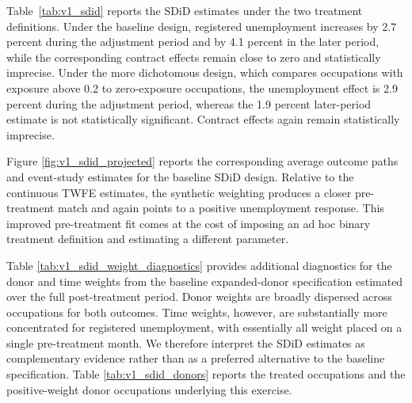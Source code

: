 \documentclass[11pt]{article}
\begin{document}
Table~\ref{tab:v1_sdid} reports the SDiD estimates under the two treatment definitions. Under the baseline design, registered unemployment increases by 2.7 percent during the adjustment period and by 4.1 percent in the later period, while the corresponding contract effects remain close to zero and statistically imprecise. Under the more dichotomous design, which compares occupations with exposure above 0.2 to zero-exposure occupations, the unemployment effect is 2.9 percent during the adjustment period, whereas the 1.9 percent later-period estimate is not statistically significant. Contract effects again remain statistically imprecise.

Figure \ref{fig:v1_sdid_projected} reports the corresponding average outcome paths and event-study estimates for the baseline SDiD design. Relative to the continuous TWFE estimates, the synthetic weighting produces a closer pre-treatment match and again points to a positive unemployment response. This improved pre-treatment fit comes at the cost of imposing an ad hoc binary treatment definition and estimating a different parameter.

Table \ref{tab:v1_sdid_weight_diagnostics} provides additional diagnostics for the donor and time weights from the baseline expanded-donor specification estimated over the full post-treatment period. Donor weights are broadly dispersed across occupations for both outcomes. Time weights, however, are substantially more concentrated for registered unemployment, with essentially all weight placed on a single pre-treatment month. We therefore interpret the SDiD estimates as complementary evidence rather than as a preferred alternative to the baseline specification. Table \ref{tab:v1_sdid_donors} reports the treated occupations and the positive-weight donor occupations underlying this exercise.


\end{document}
